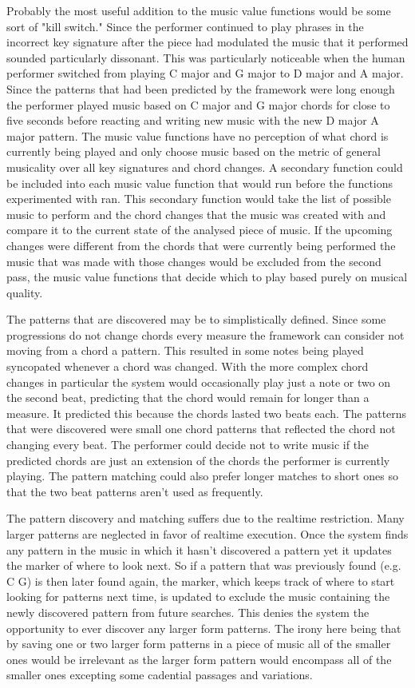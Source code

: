 \documentclass[12pt]{ucthesis}
\begin{document}
Probably the most useful addition to the music value functions would be some sort of "kill switch." Since the performer continued to play phrases in the incorrect key signature after the piece had modulated the music that it performed sounded particularly dissonant. This was particularly noticeable when the human performer switched from playing C major and G major to D major and A major. Since the patterns that had been predicted by the framework were long enough the performer played music based on C major and G major chords for close to five seconds before reacting and writing new music with the new D major A major pattern. The music value functions have no perception of what chord is currently being played and only choose music based on the metric of general musicality over all key signatures and chord changes. A secondary function could be included into each music value function that would run before the functions experimented with ran. This secondary function would take the list of possible music to perform and the chord changes that the music was created with and compare it to the current state of the analysed piece of music. If the upcoming changes were different from the chords that were currently being performed the music that was made with those changes would be excluded from the second pass, the music value functions that decide which to play based purely on musical quality. 

The patterns that are discovered may be to simplistically defined. Since some progressions do not change chords every measure the framework can consider not moving from a chord a pattern. This resulted in some notes being played syncopated whenever a chord was changed. With the more complex chord changes in particular the system would occasionally play just a note or two on the second beat, predicting that the chord would remain for longer than a measure. It predicted this because the chords lasted two beats each. The patterns that were discovered were small one chord patterns that reflected the chord not changing every beat. The performer could decide not to write music if the predicted chords are just an extension of the chords the performer is currently playing. The pattern matching could also prefer longer matches to short ones so that the two beat patterns aren't used as frequently.

The pattern discovery and matching suffers due to the realtime restriction. Many larger patterns are neglected in favor of realtime execution. Once the system finds any pattern in the music in which it hasn't discovered a pattern yet it updates the marker of where to look next. So if a pattern that was previously found (e.g. C G) is then later found again, the marker, which keeps track of where to start looking for patterns next time, is updated to exclude the music containing the newly discovered pattern from future searches. This denies the system the opportunity to ever discover any larger form patterns. The irony here being that by saving one or two larger form patterns in a piece of music all of the smaller ones would be irrelevant as the larger form pattern would encompass all of the smaller ones excepting some cadential passages and variations. 
\end{document}
